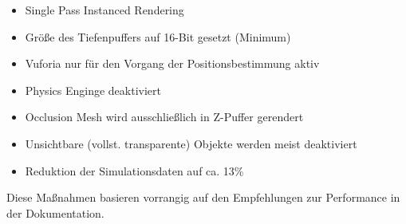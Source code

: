 \begin{itemize}
	\setlength{\itemsep}{-1pt}
	\singlespacing
	\item Single Pass Instanced Rendering
	\item Größe des Tiefenpuffers auf 16-Bit gesetzt (Minimum)
	\item Vuforia nur für den Vorgang der Positionsbestimmung aktiv
	\item Physics Enginge deaktiviert
	\item Occlusion Mesh wird ausschließlich in Z-Puffer gerendert
	\item Unsichtbare (vollst. transparente) Objekte werden meist deaktiviert
	\item Reduktion der Simulationsdaten auf ca. 13\%
\end{itemize}

Diese Maßnahmen basieren vorrangig auf den Empfehlungen zur Performance in der Dokumentation.